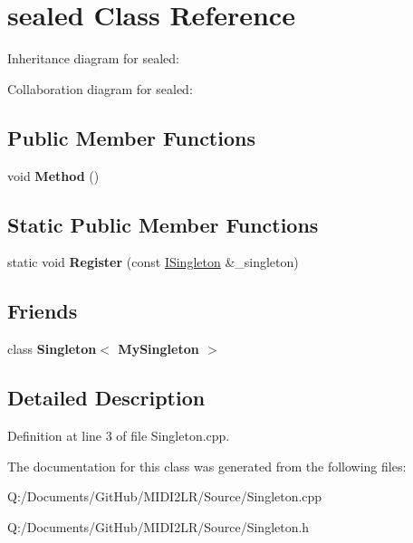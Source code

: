 \hypertarget{classsealed}{}\section{sealed Class Reference}
\label{classsealed}


Inheritance diagram for sealed\+:


Collaboration diagram for sealed\+:
\subsection*{Public Member Functions}
\begin{DoxyCompactItemize}
\item 
void {\bfseries Method} ()\hypertarget{classsealed_a650aa1f57c9fb820bb9f3ca702e0f149}{}\label{classsealed_a650aa1f57c9fb820bb9f3ca702e0f149}

\end{DoxyCompactItemize}
\subsection*{Static Public Member Functions}
\begin{DoxyCompactItemize}
\item 
static void {\bfseries Register} (const \hyperlink{class_i_singleton}{I\+Singleton} \&\+\_\+singleton)\hypertarget{classsealed_a67f2e982149c70b1ad52b6bc28fc14ed}{}\label{classsealed_a67f2e982149c70b1ad52b6bc28fc14ed}

\end{DoxyCompactItemize}
\subsection*{Friends}
\begin{DoxyCompactItemize}
\item 
class {\bfseries Singleton$<$ My\+Singleton $>$}\hypertarget{classsealed_aaff7a312f915bf84cd0177faab598ace}{}\label{classsealed_aaff7a312f915bf84cd0177faab598ace}

\end{DoxyCompactItemize}


\subsection{Detailed Description}


Definition at line 3 of file Singleton.\+cpp.



The documentation for this class was generated from the following files\+:\begin{DoxyCompactItemize}
\item 
Q\+:/\+Documents/\+Git\+Hub/\+M\+I\+D\+I2\+L\+R/\+Source/Singleton.\+cpp\item 
Q\+:/\+Documents/\+Git\+Hub/\+M\+I\+D\+I2\+L\+R/\+Source/Singleton.\+h\end{DoxyCompactItemize}
